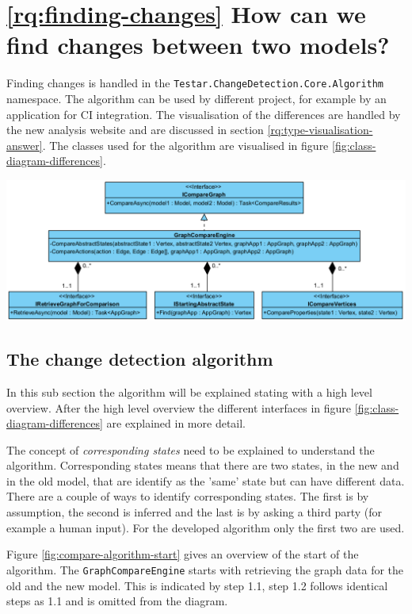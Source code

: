 \section{\ref{rq:finding-changes} How can we find changes between two models?}


Finding changes is handled in the \verb|Testar.ChangeDetection.Core.Algorithm| namespace. The algorithm can be used by different project, for example by an application for CI integration. The visualisation of the differences are handled by the new analysis website and are discussed in section \ref{rq:type-visualisation-answer}. The classes used for the algorithm are visualised in figure \ref{fig:class-diagram-differences}. 

\begingroup
\captionsetup{type=figure}
\includegraphics[scale=0.65]{images/4-UML-Differences.png}
\label{fig:class-diagram-differences}
\endgroup

\subsection{The change detection algorithm} \label{sec:change-detection-algorithm}
In this sub section the algorithm will be explained stating with a high level overview. After the high level overview the different interfaces in figure \ref{fig:class-diagram-differences} are explained in more detail.

The concept of \textit{corresponding states} need to be explained to understand the algorithm. Corresponding states means that there are two states, in the new and in the old model, that are identify as the 'same' state but can have different data. There are a couple of ways to identify corresponding states. The first is by assumption, the second is inferred and the last is by asking a third party (for example a human input). For the developed algorithm only the first two are used. 

Figure \ref{fig:compare-algorithm-start} gives an overview of the start of the algorithm. The \verb|GraphCompareEngine| starts with retrieving the graph data for the old and the new model. This is indicated by step 1.1, step 1.2 follows identical steps as 1.1 and is omitted from the diagram.
\newpage

